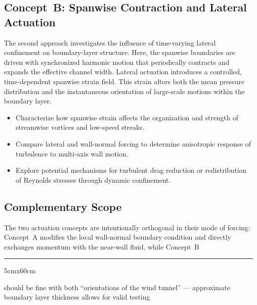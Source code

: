 \documentclass[11pt]{amsart}
\begin{document}
\subsection{Concept~B: Spanwise Contraction and Lateral Actuation}

The second approach investigates the influence of time-varying lateral confinement on boundary-layer structure.
Here, the spanwise boundaries are driven with synchronized harmonic motion that periodically contracts and expands the effective channel width. Lateral actuation introduces a controlled, time-dependent spanwise strain field. This strain alters both the mean pressure distribution and the instantaneous orientation of large-scale motions within the boundary layer. 
\begin{itemize}
    \item Characterize how spanwise strain affects the organization and strength of streamwise vortices and low-speed streaks.
    \item Compare lateral and wall-normal forcing to determine anisotropic response of turbulence to multi-axis wall motion.
    \item Explore potential mechanisms for turbulent drag reduction or redistribution of Reynolds stresses through dynamic confinement.
\end{itemize}

\subsection{Complementary Scope}

The two actuation concepts are intentionally orthogonal in their mode of forcing: 
Concept~A modifies the local wall-normal boundary condition and directly exchanges momentum with the near-wall fluid, 
while Concept~B

\noindent\rule{\textwidth}{0.4pt}

5cmx60cm 

should be fine with both ``orientations of the wind tunnel'' --- approximate boundary layer thickness allows for valid testing
\end{document}
